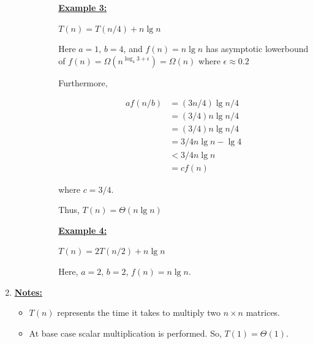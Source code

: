 \documentclass[12pt]{article}
\begin{document}
\begin{enumerate}[1.]
\begin{itemize}
\begin{itemize}
\begin{itemize}
                \bigskip

                \underline{\textbf{Example 3:}}

                \bigskip

                $T(n) = T(n/4) + n \lg n$

                \bigskip

                Here $a = 1$, $b = 4$, and $f(n) = n \lg n$ has asymptotic lowerbound of $f(n) = \Omega(n^{\log_4 3 + \epsilon}) = \Omega(n)$
                where $\epsilon \approx 0.2$

                \bigskip

                Furthermore,

                \begin{align*}
                    af(n/b) &= (3n/4) \lg n/4\\
                    &= (3/4) n \lg n/4\\
                    &= (3/4) n \lg n/4\\
                    &= 3/4 n\lg n - \lg 4\\
                    &< 3/4 n\lg n\\
                    &= c f(n)
                \end{align*}

                where $c = 3/4$.

                \bigskip

                Thus, $T(n) = \Theta(n\lg n)$

                \bigskip

                \underline{\textbf{Example 4:}}

                \bigskip

                $T(n) = 2 T(n/2) + n\lg n$

                \bigskip

                Here, $a = 2$, $b = 2$, $f(n) = n \lg n$.

            \end{itemize}
        \end{itemize}
    \end{itemize}

    \item

    \bigskip

    \underline{\textbf{Notes:}}

    \bigskip

    \begin{itemize}
        \item $T(n)$ represents the time it takes to multiply two $n \times n$ matrices.
        \item At base case scalar multiplication is performed. So, $T(1) = \Theta(1)$.
    \end{itemize}


\end{enumerate}
\end{document}
